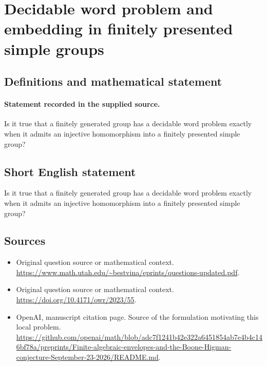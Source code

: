 \documentclass[11pt]{article}
\begin{document}
\section*{Decidable word problem and embedding in finitely presented simple groups}\label{30007191}
\subsection{Definitions and mathematical statement}
\paragraph{Statement recorded in the supplied source.}
Is it true that a finitely generated group has a decidable word problem exactly when it admits an injective homomorphism into a finitely presented simple group?
\subsection{Short English statement}
Is it true that a finitely generated group has a decidable word problem exactly when it admits an injective homomorphism into a finitely presented simple group?
\subsection{Sources}
\begin{itemize}
\item[S1] Original question source or mathematical context.
\url{https://www.math.utah.edu/~bestvina/eprints/questions-updated.pdf}.
\item[S2] Original question source or mathematical context.
\url{https://doi.org/10.4171/owr/2023/55}.
\item[S3] OpenAI, manuscript citation page. Source of the formulation motivating this local problem.
\url{https://github.com/openai/math/blob/adc7f1241b42e322a6451854ab7e4b4c146bf78a/preprints/Finite-algebraic-envelopes-and-the-Boone-Higman-conjecture-September-23-2026/README.md}.
\end{itemize}
\end{document}
